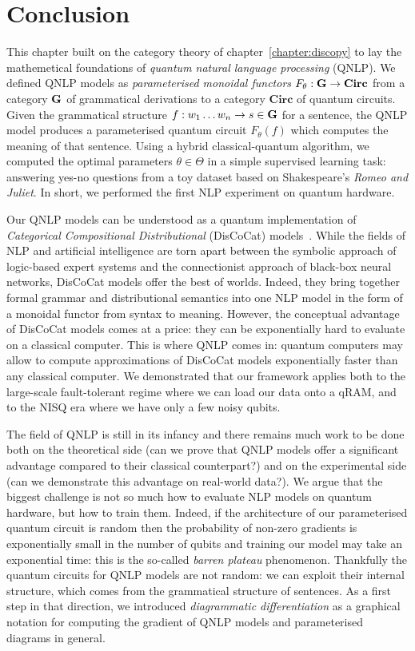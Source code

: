 
\section{Conclusion} \label{section:conclusion}

This chapter built on the category theory of chapter~\ref{chapter:discopy} to lay the mathemetical foundations of \emph{quantum natural language processing} (QNLP).
We defined QNLP models as \emph{parameterised monoidal functors} $F_\theta : \mathbf{G} \to \mathbf{Circ}$ from a category $\mathbf{G}$ of grammatical derivations to a category $\mathbf{Circ}$ of quantum circuits.
Given the grammatical structure $f : w_1 \dots w_n \to s \in \mathbf{G}$ for a sentence, the QNLP model produces a parameterised quantum circuit $F_\theta(f)$ which computes the meaning of that sentence.
Using a hybrid classical-quantum algorithm, we computed the optimal parameters $\theta \in \Theta$ in a simple supervised learning task: answering yes-no questions from a toy dataset based on Shakespeare's \emph{Romeo and Juliet}.
In short, we performed the first NLP experiment on quantum hardware.

Our QNLP models can be understood as a quantum implementation of \emph{Categorical Compositional Distributional} (DisCoCat) models~\cite{ClarkEtAl08}.
While the fields of NLP and artificial intelligence are torn apart between the symbolic approach of logic-based expert systems and the connectionist approach of black-box neural networks, DisCoCat models offer the best of worlds.
Indeed, they bring together formal grammar and distributional semantics into one NLP model in the form of a monoidal functor from syntax to meaning.
However, the conceptual advantage of DisCoCat models comes at a price: they can be exponentially hard to evaluate on a classical computer.
This is where QNLP comes in: quantum computers may allow to compute approximations of DisCoCat models exponentially faster than any classical computer.
We demonstrated that our framework applies both to the large-scale fault-tolerant regime where we can load our data onto a qRAM, and to the NISQ era where we have only a few noisy qubits.

The field of QNLP is still in its infancy and there remains much work to be done both on the theoretical side (can we prove that QNLP models offer a significant advantage compared to their classical counterpart?) and on the experimental side (can we demonstrate this advantage on real-world data?).
We argue that the biggest challenge is not so much how to evaluate NLP models on quantum hardware, but how to train them.
Indeed, if the architecture of our parameterised quantum circuit is random then the probability of non-zero gradients is exponentially small in the number of qubits and training our model may take an exponential time: this is the so-called \emph{barren plateau} phenomenon.
Thankfully the quantum circuits for QNLP models are not random: we can exploit their internal structure, which comes from the grammatical structure of sentences.
As a first step in that direction, we introduced \emph{diagrammatic differentiation} as a graphical notation for computing the gradient of QNLP models and parameterised diagrams in general.

